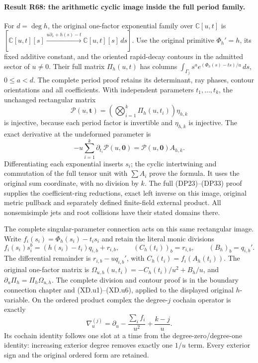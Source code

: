 \paragraph{Result R68: the arithmetic cyclic image inside the full period family.}
For $d=\deg h$, the original one-factor exponential family over
$\mathbb C[u,t]$ is
$[\mathbb C[u,t][s]\xrightarrow{u\partial_s+h(s)-t}
\mathbb C[u,t][s]\,ds]$.
Use the original primitive $\Phi_h'=h$, its fixed additive constant,
and the oriented rapid-decay contours in the admitted sector
of $u\ne0$. Their full matrix $\Pi_h(u,t)$ has columns
$\int_{\Gamma_j}s^a e^{(\Phi_h(s)-ts)/u}\,ds$, $0\le a<d$.
The complete period proof retains its determinant, ray phases,
contour orientations and all coefficients. With independent
parameters $t_1,\ldots,t_k$, the unchanged rectangular matrix
\[
\mathcal P(u,\mathbf t)=
  \left(\bigotimes_{i=1}^k\Pi_h(u,t_i)\right)\eta_{h,k}
\]
is injective, because each period factor is invertible and
$\eta_{h,k}$ is injective. The exact derivative at the
undeformed parameter is
\[
-u\sum_{i=1}^k\partial_{t_i}\mathcal P(u,\mathbf0)
=\mathcal P(u,\mathbf0)A_{h,k}.
\]
Differentiating each exponential inserts $s_i$; the cyclic
intertwining and commutation of the full tensor unit with
$\sum A_i$ prove the formula. It uses the original sum
coordinate, with no division by $k$.
The full (DP23)--(DP33) proof supplies the coefficient-ring
reductions, exact left inverse on this image, original metric
pullback and separately defined finite-field external product.
All nonsemisimple jets and root collisions have their stated
domains there.

The complete singular-parameter connection acts on this same
rectangular image. Write \(f_i(s_i)=\Phi_h(s_i)-t_is_i\) and retain
the literal monic divisions
\[
 f_i(s_i)s_i^b=(h(s_i)-t_i)q_{i,b}+r_{i,b},\qquad
 (C_h(t_i))_b=r_{i,b},\qquad (B_h)_b=q_{i,b}' .
\]
The differential remainder is \(r_{i,b}-uq_{i,b}'\), with
\(C_h(t_i)=f_i(A_h(t_i))\). The original one-factor matrix is
\(\Omega_{u,h}(u,t_i)=-C_h(t_i)/u^2+B_h/u\), and
\(\partial_u\Pi_h=\Pi_h\Omega_{u,h}\).
The complete division and contour proof is in the boundary
connection chapter and (XD.u1)--(XD.u6), applied to the displayed
original \(h\)-variable. On the ordered product complex the
degree-\(j\) cochain operator is exactly
\[
 \nabla_u^{(j)}=\partial_u-\frac{\sum_i f_i}{u^2}+\frac{k-j}{u}.
\]
Its cochain identity follows one slot at a time from the
degree-zero/degree-one identity: increasing exterior degree
removes exactly one \(1/u\) term. Every exterior sign and the
original ordered form are retained.

